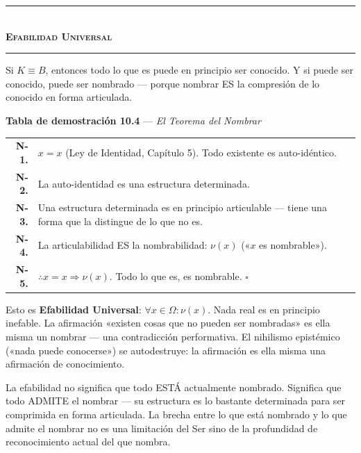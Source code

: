 \documentclass[10pt, openany, oneside]{book}
\renewcommand{\normalsize}{\fontsize{10}{13}\selectfont}
\renewcommand{\footnotesize}{\fontsize{8.5}{11}\selectfont}
\begin{document}
\begin{center}
    \rule{0.3\textwidth}{0.4pt}\\[0.5em]
    {\normalsize\bfseries\scshape Efabilidad Universal}\\[0.3em]
    \rule{0.3\textwidth}{0.4pt}
\end{center}

\vspace{1em}

\noindent Si $K \equiv B$, entonces todo lo que es puede en principio ser conocido. Y si puede ser conocido, puede ser nombrado --- porque nombrar ES la compresión de lo conocido en forma articulada.

\textbf{Tabla de demostración 10.4} --- \textit{El Teorema del Nombrar}

\vspace{0.5em}

{\footnotesize
\noindent\begin{tabular}{r p{}}
\textbf{N-1.} & $x = x$ (Ley de Identidad, Capítulo 5). Todo existente es auto-idéntico. \\[0.3em]
\textbf{N-2.} & La auto-identidad es una estructura determinada. \\[0.3em]
\textbf{N-3.} & Una estructura determinada es en principio articulable --- tiene una forma que la distingue de lo que no es. \\[0.3em]
\textbf{N-4.} & La articulabilidad ES la nombrabilidad: $\nu(x)$ («$x$ es nombrable»). \\[0.3em]
\textbf{N-5.} & $\therefore x = x \Rightarrow \nu(x)$. Todo lo que es, es nombrable. $\square$ \\[0.3em]
\end{tabular}
}

\vspace{0.8em}

\noindent Esto es \textbf{Efabilidad Universal}: $\forall x \in \Omega: \nu(x)$. Nada real es en principio inefable. La afirmación «existen cosas que no pueden ser nombradas» es ella misma un nombrar --- una contradicción performativa. El nihilismo epistémico («nada puede conocerse») se autodestruye: la afirmación es ella misma una afirmación de conocimiento.

La efabilidad no significa que todo ESTÁ actualmente nombrado. Significa que todo ADMITE el nombrar --- su estructura es lo bastante determinada para ser comprimida en forma articulada. La brecha entre lo que está nombrado y lo que admite el nombrar no es una limitación del Ser sino de la profundidad de reconocimiento actual del que nombra.
\end{document}
